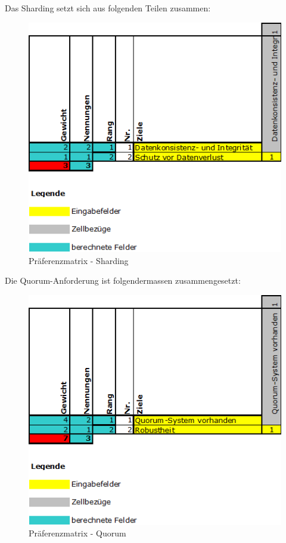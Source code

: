\begin{flushleft}
    Das Sharding setzt sich aus folgenden Teilen zusammen:
    \begin{figure}[H]
        \centering
        \includegraphics[width=0.75\linewidth]{source/implementation/evaluation/requirements/preference_matrix_sharding}
        \caption{Präferenzmatrix - Sharding}
        \label{fig:preference_matrix_sharding}
    \end{figure}
\end{flushleft}
\begin{flushleft}
    Die Quorum-Anforderung ist folgendermassen zusammengesetzt:
    \begin{figure}[H]
        \centering
        \includegraphics[width=0.75\linewidth]{source/implementation/evaluation/requirements/preference_matrix_quorum}
        \caption{Präferenzmatrix - Quorum}
        \label{fig:preference_matrix_quorum}
    \end{figure}
\end{flushleft}
